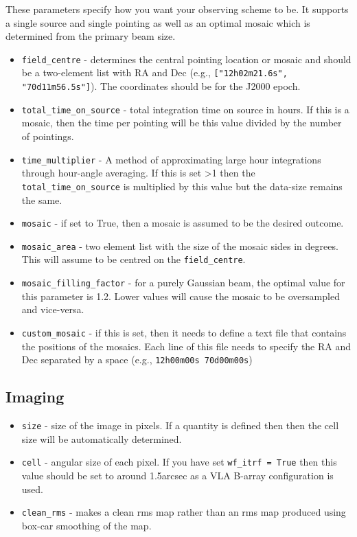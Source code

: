\documentclass[11pt]{report_jfr}
\begin{document}
These parameters specify how you want your observing scheme to be. It supports a single source and single pointing as well as an optimal mosaic which is determined from the primary beam size.
%
\begin{itemize}
	\item \texttt{field\_centre} - determines the central pointing location or mosaic and should be a two-element list with RA and Dec (e.g., \texttt{["12h02m21.6s", "70d11m56.5s"]}). The coordinates should be for the J2000 epoch.
	\item \texttt{total\_time\_on\_source} - total integration time on source in hours. If this is a mosaic, then the time per pointing will be this value divided by the number of pointings.
	\item \texttt{time\_multiplier} - A method of approximating large hour integrations through hour-angle averaging. If this is set >1 then the \texttt{total\_time\_on\_source} is multiplied by this value but the data-size remains the same.
	\item \texttt{mosaic} - if set to True, then a mosaic is assumed to be the desired outcome.                             
	\item \texttt{mosaic\_area} - two element list with the size of the mosaic sides in degrees. This will assume to be centred on the \texttt{field\_centre}.         
	\item \texttt{mosaic\_filling\_factor} - for a purely Gaussian beam, the optimal value for this parameter is 1.2. Lower values will cause the mosaic to be oversampled and vice-versa. 
	\item \texttt{custom\_mosaic} - if this is set, then it needs to define a text file that contains the positions of the mosaics. Each line of this file needs to specify the RA and Dec separated by a space (e.g., \texttt{12h00m00s 70d00m00s})
\end{itemize}

\subsection{Imaging}
%
\begin{itemize}
	\item\texttt{size} - size of the image in pixels. If a quantity is defined then then the cell size will be automatically determined.
	\item \texttt{cell} - angular size of each pixel. If you have set \texttt{wf\_itrf = True} then this value should be set to around 1.5arcsec as a VLA B-array configuration is used.
	\item \texttt{clean\_rms} - makes a clean rms map rather than an rms map produced using box-car smoothing of the map.
\end{itemize}
\end{document}
